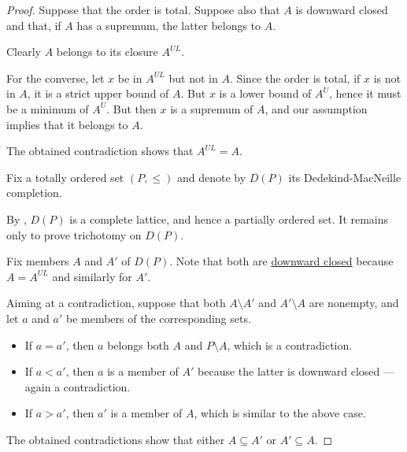 \begin{proof}
   Suppose that the order is total. Suppose also that \( A \) is downward closed and that, if \( A \) has a supremum, the latter belongs to \( A \).

  Clearly \( A \) belongs to its closure \( A^{UL} \).

  For the converse, let \( x \) be in \( A^{UL} \) but not in \( A \). Since the order is total, if \( x \) is not in \( A \), it is a strict upper bound of \( A \). But \( x \) is a lower bound of \( A^U \), hence it must be a minimum of \( A^U \). But then \( x \) is a supremum of \( A \), and our assumption implies that it belongs to \( A \).

  The obtained contradiction shows that \( A^{UL} = A \).

   Fix a totally ordered set \( (P, \leq) \) and denote by \( D(P) \) its Dedekind-MacNeille completion.

  By , \( D(P) \) is a complete lattice, and hence a partially ordered set. It remains only to prove trichotomy on \( D(P) \).

  Fix members \( A \) and \( A' \) of \( D(P) \). Note that both are \hyperref[def:closed_ordered_subset]{downward closed} because \( A = A^{UL} \) and similarly for \( A' \).

  Aiming at a contradiction, suppose that both \( A \setminus A' \) and \( A' \setminus A \) are nonempty, and let \( a \) and \( a' \) be members of the corresponding sets.

  \begin{itemize}
    \item If \( a = a' \), then \( a \) belongs both \( A \) and \( P \setminus A \), which is a contradiction.
    \item If \( a < a' \), then \( a \) is a member of \( A' \) because the latter is downward closed --- again a contradiction.
    \item If \( a > a' \), then \( a' \) is a member of \( A \), which is similar to the above case.
  \end{itemize}

  The obtained contradictions show that either \( A \subseteq A' \) or \( A' \subseteq A \).
\end{proof}

